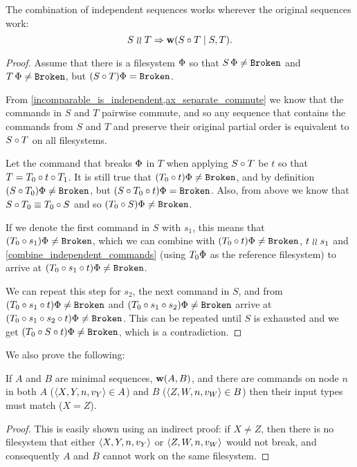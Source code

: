 \begin{mylem}\label{combine_independent_sequences}
The combination of independent sequences works wherever the original sequences work:
\[ S\mathrel{\wr\wr} T \Rightarrow \mathbf{w}({S\circ T}\mathrel{|}{S,T}). \]
\end{mylem}
\begin{proof}
Assume that there is a filesystem $\Phi$ so that
$S\,\Phi\neq\mathtt{Broken}$ and $T\,\Phi\neq\mathtt{Broken}$, but
$(S\circ T)\Phi=\mathtt{Broken}$.

From \cref{incomparable_is_independent,ax_separate_commute} we know that
the commands in $S$ and $T$ pairwise commute, and so any sequence
that contains the commands from $S$ and $T$ and preserve their original partial order
is equivalent to $S\circ T$ on all filesystems.

Let the command that breaks $\Phi$ in $T$ when applying $S\circ T$ be $t$
so that $T=T_0\circ t\circ T_1$.
It is still true that $(T_0 \circ t)\Phi\neq\mathtt{Broken}$,
and by definition $(S\circ T_0)\Phi\neq\mathtt{Broken}$,
but $(S\circ T_0\circ t)\Phi=\mathtt{Broken}$.
Also, from above we know that $S\circ T_0\equiv T_0\circ S$
and so $(T_0 \circ S)\Phi\neq\mathtt{Broken}$.

If we denote the first command in $S$ with $s_1$,
this means that $(T_0 \circ s_1)\Phi\neq\mathtt{Broken}$,
which we can combine with $(T_0 \circ t)\Phi\neq\mathtt{Broken}$, $t\mathrel{\wr\wr} s_1$ and
\cref{combine_independent_commands}
(using $T_0\Phi$ as the reference filesystem)
to arrive at $(T_0 \circ s_1\circ t)\Phi\neq\mathtt{Broken}$.

We can repeat this step for $s_2$, the next command in $S$,
and from 
$(T_0 \circ s_1\circ t)\Phi\neq\mathtt{Broken}$
and
$(T_0 \circ s_1\circ s_2)\Phi\neq\mathtt{Broken}$
arrive at
$(T_0 \circ s_1\circ s_2\circ t)\Phi\neq\mathtt{Broken}$.
This can be repeated until $S$ is exhausted and we get
$(T_0 \circ S\circ t)\Phi\neq\mathtt{Broken}$, which is a contradiction.
\end{proof}

We also prove the following:

\begin{mylem}\label{worksinputmatch}
If $A$ and $B$ are minimal sequences, $\mathbf{w}({A,B})$,
and there are commands on node $n$ in both $A$ ($\langle{X,Y,n,v_Y}\rangle\in A$) and $B$ ($\langle{Z,W,n,v_W}\rangle\in B$)
then their input types must match ($X=Z$).
\end{mylem}
\begin{proof}
This is easily shown using an indirect proof: if $X\neq Z$, then there is no filesystem that
either $\langle{X,Y,n,v_Y}\rangle$ or $\langle{Z,W,n,v_W}\rangle$ would not break, 
and consequently $A$ and $B$ cannot work on the same filesystem.
\end{proof}


